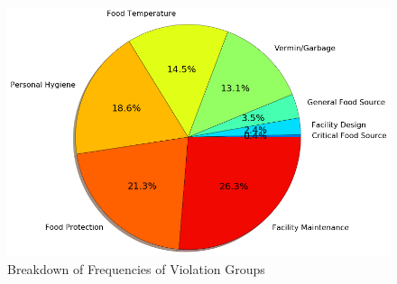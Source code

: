 \documentclass[11pt]{article}
\begin{document}
\begin{figure}
\centering
\includegraphics[scale = 0.5]{Figures/viol_group_pie.png}
\caption{Breakdown of Frequencies of Violation Groups}
\label{task_pie}
\end{figure}
\end{document}
